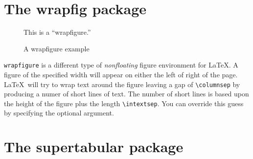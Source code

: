 \documentclass[a4paper]{article}
\newcommand*\mycaptionstyle{%
  \captionstyle{indent}%
  \renewcommand\captionfont{\small}%
  \renewcommand\captionlabelfont{\bfseries}%
  \setcaptionmargin{\leftmargini}%
  \setlength\captionindent{\parindent}%
  \renewcommand\captionlabeldelim{.}%
  \onelinecaptionstrue}
\begin{document}
\section{The wrapfig package}
\sloppy

\begin{figure}
  \begin{center} This is a ``wrapfigure.'' \end{center}
  \caption{A wrapfigure example}
\end{figure}
\texttt{wrapfigure} is a different type of \emph{nonfloating} figure environment
for \LaTeX. A figure of the specified width will appear on either the left of right
of the page. \LaTeX\ will try to wrap text around the figure leaving a gap of
\verb|\columnsep| by producing a numer of short lines of text. The number of short
lines is based upon the height of the figure plus the length \verb|\intextsep|.
You can override this guess by specifying the optional argument.

\fussy
\fi


\ifx\supertabular\undefined
\else
\clearpage
\mycaptionstyle
\section{The supertabular package}
\newcommand{\tbsp}{\rule{0pt}{18pt}}
\end{document}
